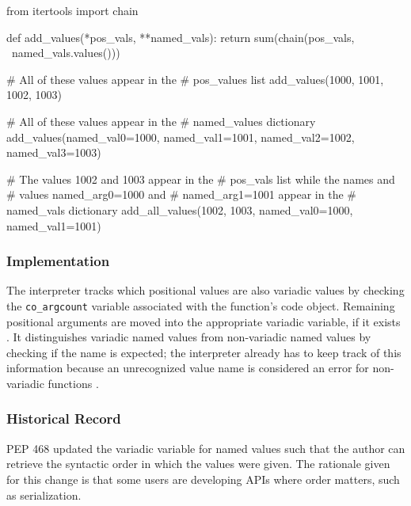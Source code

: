 \begin{pygmented}[lang=python]
from itertools import chain

def add_values(*pos_vals, **named_vals):
	return sum(chain(pos_vals, \
	                 named_vals.values()))

# All of these values appear in the
# pos_values list
add_values(1000, 1001, 1002, 1003)

# All of these values appear in the
# named_values dictionary
add_values(named_val0=1000,
           named_val1=1001,
           named_val2=1002,
           named_val3=1003)

# The values 1002 and 1003 appear in the
# pos_vals list while the names and
# values named_arg0=1000 and
# named_arg1=1001 appear in the
# named_vals dictionary
add_all_values(1002,
               1003,
               named_val0=1000,
               named_val1=1001)
\end{pygmented}

\subsubsection{Implementation}

The interpreter tracks which positional values are also variadic values by checking the
\texttt{co\_argcount} variable associated with the function's code object.
Remaining positional arguments are moved into the appropriate variadic variable, if it
exists \parencite[][Python/ceval.c lines 1355-1376]{python-source}.
It distinguishes variadic named values from non-variadic named values by checking if the
name is expected; the interpreter already has to keep track of this information because
an unrecognized value name is considered an error for non-variadic functions
\parencite[][Python/ceval.c lines 1378-1455]{python-source}.

\subsubsection{Historical Record}
PEP 468 updated the variadic variable for named values such that the author can retrieve
the syntactic order in which the values were given.
The rationale given for this change is that some users are developing APIs where order
matters, such as serialization. \parencite[][peps/pep-0468.rst]{python-peps}
